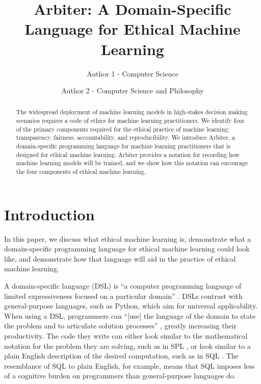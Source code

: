 \documentclass[letterpaper]{article}
\title{Arbiter: A Domain-Specific Language for Ethical Machine Learning}
\author{Author 1 - Computer Science \and Author 2 - Computer Science and Philosophy }
\newcommand{\citep}[1]{\cite{#1}}
\begin{document}
\maketitle
\begin{abstract}
The widespread deployment of machine learning models in high-stakes decision making scenarios requires a code of ethics for machine learning practitioners. We identify four of the primary components required for the ethical practice of machine learning: transparency, fairness, accountability, and reproducibility. We introduce Arbiter, a domain-specific programming language for machine learning practitioners that is designed for ethical machine learning. Arbiter provides a notation for recording how machine learning models will be trained, and we show how this notation can encourage the four components of ethical machine learning.
\end{abstract}


\section{Introduction}
In this paper, we discuss what ethical machine learning is, demonstrate what a domain-specific programming language for ethical machine learning could look like, and demonstrate how that language will aid in the practice of ethical machine learning. 

A domain-specific language (DSL) is ``a computer programming language of limited expressiveness focused on a particular domain'' \citep{Fowler2010}. DSLs contrast with general-purpose languages, such as Python, which aim for universal applicability. When using a DSL, programmers can ``[use] the language of the domain to state the problem and to articulate solution processes'' \citep{Felleisen2015}, greatly increasing their productivity. The code they write can either look similar to the mathematical notation for the problem they are solving, such as in SPL \citep{Werk2012}, or look similar to a plain English description of the desired computation, such as in SQL \citep{Date1997}. The resemblance of SQL to plain English, for example, means that SQL imposes less of a cognitive burden on programmers than general-purpose languages do.
\end{document}
